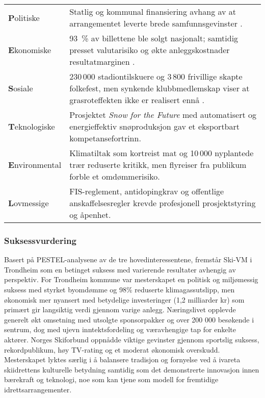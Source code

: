 \begin{table}[H]
    \centering
    \begin{tabular}{@{}p{2.7cm}p{10.2cm}@{}}
        \toprule                                                                                                                                                                                            \\ \midrule
        \textbf{P}olitiske     & Statlig og kommunal finansiering avhang av at arrangementet leverte brede samfunnsgevinster \cite{TrondheimKommuneVM}.                                                     \\
        \textbf{E}konomiske    & 93~\% av billettene ble solgt nasjonalt; samtidig presset valutarisiko og økte anleggskostnader resultatmarginen \cite{AdressaKjopefest}.                                  \\
        \textbf{S}osiale       & 230\,000 stadiontilskuere og 3\,800 frivillige skapte folkefest, men synkende klubbmedlemskap viser at grasroteffekten ikke er realisert ennå \cite{Adresseavisen,OsloVM}. \\
        \textbf{T}eknologiske  & Prosjektet \textit{Snow for the Future} med automatisert og energieffektiv snøproduksjon gav et eksportbart kompetansefortrinn\cite{Trondheim2025Sustainability}.          \\
        \textbf{E}nvironmental & Klimatiltak som kortreist mat og 10\,000 nyplantede trær reduserte kritikk, men flyreiser fra publikum forble et omdømmerisiko.                                            \\
        \textbf{L}ovmessige    & FIS-reglement, antidopingkrav og offentlige anskaffelsesregler krevde profesjonell prosjektstyring og åpenhet.                                                             \\ \bottomrule
    \end{tabular}
\end{table}

\subsubsection{Suksessvurdering}
Basert på PESTEL-analysene av de tre hovedinteressentene, fremstår Ski-VM i Trondheim som en betinget suksess med varierende resultater avhengig av perspektiv. For Trondheim kommune var mesterskapet en politisk og miljømessig suksess med styrket byomdømme og 98\% reduserte klimagassutslipp\cite{Trondheim2025Kutt}, men økonomisk mer nyansert med betydelige investeringer (1,2 milliarder kr) som primært gir langsiktig verdi gjennom varige anlegg. Næringslivet opplevde generelt økt omsetning med utsolgte sponsorpakker og over 200 000 besøkende i sentrum\parencite{wikipediaSkiVM}, dog med ujevn inntektsfordeling og væravhengige tap for enkelte aktører\parencite{innherredTragedie}. Norges Skiforbund oppnådde viktige gevinster gjennom sportslig suksess, rekordpublikum, høy TV-rating og et moderat økonomisk overskudd\cite{Adresseavisen}. Mesterskapet lyktes særlig i å balansere tradisjon og fornyelse ved å ivareta skiidrettens kulturelle betydning samtidig som det demonstrerte innovasjon innen bærekraft og teknologi, noe som kan tjene som modell for fremtidige idrettsarrangementer.
